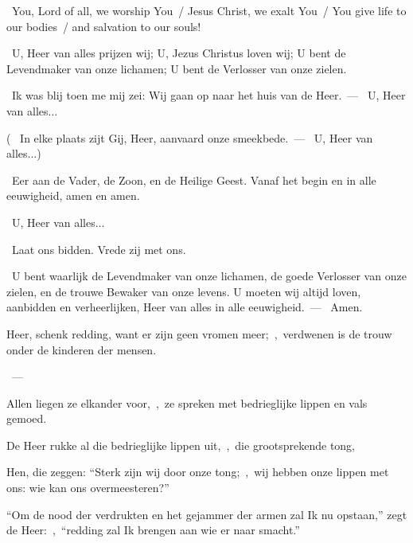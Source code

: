 \documentclass[12pt,twoside,a5paper]{article}
\begin{document}


\vspace{0.4em}
\begin{doublecols}
  \textsizexi

  \englishl \rr~You, Lord of all, we worship You~/ Jesus Christ, we exalt You~/ You give life to our bodies~/ and salvation to our souls!

   \rr~U, Heer van alles prijzen wij; U, Jezus Christus loven wij; U bent de Levendmaker van onze lichamen; U bent de Verlosser van onze zielen.
\end{doublecols}

\begin{halfparskip}
  \dd~Ik was blij toen me mij zei: Wij gaan op naar het huis van de Heer.~--- \rr~U, Heer van alles...

  ( \dd~In elke plaats zijt Gij, Heer, aanvaard onze smeekbede.~--- \rr~U, Heer van alles...)

  \cc~Eer aan de Vader, de Zoon, en de Heilige Geest. Vanaf het begin en in alle eeuwigheid, amen en amen.

  \rr~U, Heer van alles...

  \dd~Laat ons bidden. Vrede zij met ons.

  \cc~U bent waarlijk de Levendmaker van onze lichamen, de goede Verlosser van onze zielen, en de trouwe Bewaker van onze levens. U moeten wij altijd loven, aanbidden en verheerlijken, Heer van alles in alle eeuwigheid.~--- \rr~Amen.
\end{halfparskip}





\begin{halfparskip}
  Heer, schenk redding, want er zijn geen vromen meer;~\sep\ verdwenen is de trouw onder de kinderen der mensen.

  ~--- 

  Allen liegen ze elkander voor,~\sep\ ze spreken met bedrieglijke lippen en vals gemoed.

  De Heer rukke al die bedrieglijke lippen uit,~\sep\ die grootsprekende tong,

  Hen, die zeggen: ``Sterk zijn wij door onze tong;~\sep\ wij hebben onze lippen met ons: wie kan ons overmeesteren?''

  ``Om de nood der verdrukten en het gejammer der armen zal Ik nu opstaan,'' zegt de Heer:~\sep\ ``redding zal Ik brengen aan wie er naar smacht.''
\end{halfparskip}
\end{document}
